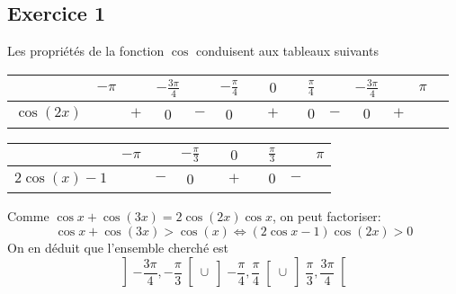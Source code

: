 \subsection*{Exercice 1}
Les propriétés de la fonction $\cos$ conduisent aux tableaux suivants

\renewcommand{\arraystretch}{1.8}
\begin{center}
\begin{tabular}{c|cccccccccccccc}
           & $-\pi$ &   & $-\frac{3\pi}{4}$ &   & $-\frac{\pi}{4}$ & & $0$ & & $\frac{\pi}{4}$ &   & $-\frac{3\pi}{4}$ &   & $\pi$ \\ \hline
$\cos(2x)$ &        &$+$&   0               &$-$&  0               & & $+$ & & $0$             &$-$& $0$               &$+$& &\\
\hline 
\end{tabular}
\end{center}

\begin{center}
\begin{tabular}{c|ccccccccc} 
             & $-\pi$ &   & $-\frac{\pi}{3}$ & & $0$ & & $\frac{\pi}{3}$ &     & $\pi$ \\ \hline
$2\cos(x)-1$ &        &$-$&   0              & & $+$ & & $0$             & $-$ &      \\
\hline
\end{tabular}
\end{center}
Comme $\cos x + \cos(3x) = 2 \cos(2x)\cos x$, on peut factoriser:
\begin{displaymath}
 \cos x + \cos(3x) > \cos(x) \Leftrightarrow (2\cos x -1)\cos(2x)>0
\end{displaymath}
On en déduit que l'ensemble cherché est
\begin{displaymath}
 \left]-\frac{3\pi}{4},-\frac{\pi}{3} \right[ \cup 
 \left]-\frac{\pi}{4},\frac{\pi}{4} \right[ \cup 
 \left]\frac{\pi}{3},\frac{3\pi}{4} \right[ 
\end{displaymath}

